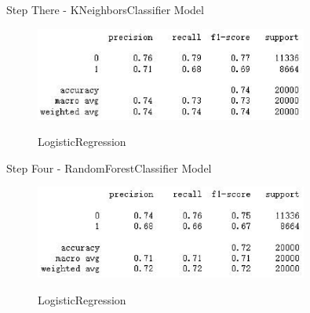 \documentclass[
size=14pt,
paper=smartboard,  %
mode=present, 		%
display=slides, 	%
style=tuliplab,  	%
pauseslide,
fleqn,leqno]{powerdot}
\begin{document}
	
	\begin{slide}{Step There - KNeighborsClassifier Model}
		\begin{figure}
			\centering
			\includegraphics[width=0.8\textwidth]{figures//fig9.eps}\\
			\caption{LogisticRegression}
		\end{figure}
	\end{slide}
	
	
	\begin{slide}{Step Four - RandomForestClassifier Model}
		\begin{figure}
			\centering
			\includegraphics[width=0.8\textwidth]{figures//fig10.eps}\\
			\caption{LogisticRegression}
		\end{figure}
	\end{slide}
	
\end{document}
